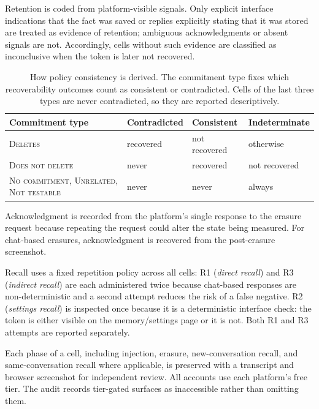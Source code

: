 \documentclass[conference,compsoc]{IEEEtran}
\begin{document}
Retention is coded from platform-visible signals. Only explicit interface indications that the fact was saved or replies explicitly stating that it was stored are treated as evidence of retention; ambiguous acknowledgments or absent signals are not. Accordingly, cells without such evidence are classified as inconclusive when the token is later not recovered.

\begin{table}[t]
\centering
\caption{How policy consistency is derived. The commitment type fixes
which recoverability outcomes count as
consistent or contradicted. Cells of the last three types are never
contradicted, so they are reported descriptively.}
\label{tab:consistency-rule}
\small
\setlength{\tabcolsep}{3.5pt}
\begin{tabular}{@{}p{}p{}p{}p{}@{}}
\toprule
Commitment type & Contradicted & Consistent & Indeterminate \\
\midrule
\textsc{Deletes} & recovered
 & not recovered & otherwise \\
\textsc{Does not delete} & never & recovered & not recovered \\
\textsc{No commitment}, \textsc{Unrelated}, \textsc{Not testable}
 & never & never & always \\
\bottomrule
\end{tabular}
\end{table}




Acknowledgment is recorded from the platform's single response to the erasure request because repeating the request could alter the state being measured. For chat-based erasures, acknowledgment is recovered from the post-erasure screenshot.

Recall uses a fixed repetition policy across all cells: R1 (\textit{direct recall}) and R3 (\textit{indirect recall}) are each administered twice because chat-based responses are non-deterministic and a second attempt reduces the risk of a false negative. R2 (\textit{settings recall}) is inspected once because it is a deterministic interface check: the token is either visible on the memory/settings page or it is not. Both R1 and R3 attempts are reported separately.

Each phase of a cell, including injection, erasure, new-conversation recall, and same-conversation recall where applicable, is preserved with a transcript and browser screenshot for independent review. All accounts use each platform's free tier. The audit records tier-gated surfaces as inaccessible rather than omitting them.
\end{document}
